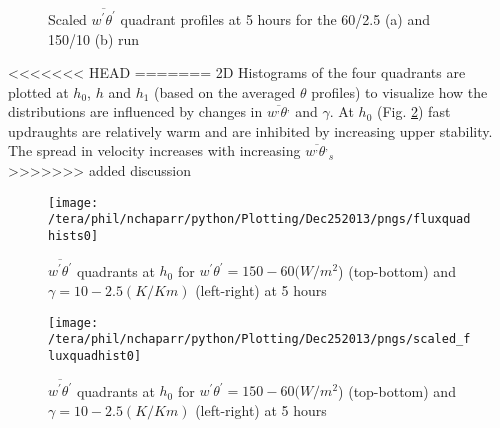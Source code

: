 \begin{figure}[htbp]
\begin{minipage}[b]{0.5\linewidth}
        \\
        \end{minipage}             
\quad
\begin{minipage}[b]{0.5\linewidth}
        \\
       \end{minipage}
        \caption{Scaled $\overline{w^{'} \theta^{'}}$ quadrant profiles at 5 hours for the 60/2.5 (a) and 150/10 (b) run}
        \label{fig:fluxqadprofs}
\end{figure}

<<<<<<< HEAD
=======
2D Histograms of the four quadrants are plotted at $h_{0}$, $h$ and $h_{1}$ (based on the averaged $\theta$ profiles)
to visualize how the distributions are influenced by changes in $\overline{w^{,} \theta^{,}}$ and $\gamma$.  At $h_{0}$
(Fig. \ref{fig:fluxquadsh0}) fast updraughts are relatively warm and are inhibited by increasing upper stability.  The spread
in velocity increases with increasing $\overline{w^{,}\theta^{,}}_{s}$\\

>>>>>>> added discussion

\begin{figure}[htbp]
\centering
 \texttt{[image: /tera/phil/nchaparr/python/Plotting/Dec252013/pngs/fluxquadhists0]}                 
\label{fig:fluxquadsh0}
\caption{ $\overline{w^{'}\theta^{'}}$ quadrants at $h_{0}$ for $w^{'}\theta^{'} = 150 - 60 (W/m^{2}$) (top-bottom) and $\gamma = 10 - 2.5 (K/Km)$ (left-right) at 5 hours}
\end{figure}

\begin{figure}[htbp]
\centering
 \texttt{[image: /tera/phil/nchaparr/python/Plotting/Dec252013/pngs/scaled\_fluxquadhist0]}                 
\label{fig:scaled_fluxquadsh0}
\caption{ $\overline{w^{'}\theta^{'}}$ quadrants at $h_{0}$ for $w^{'}\theta^{'} = 150 - 60 (W/m^{2}$) (top-bottom) and $\gamma = 10 - 2.5 (K/Km)$ (left-right) at 5 hours}
\end{figure}


